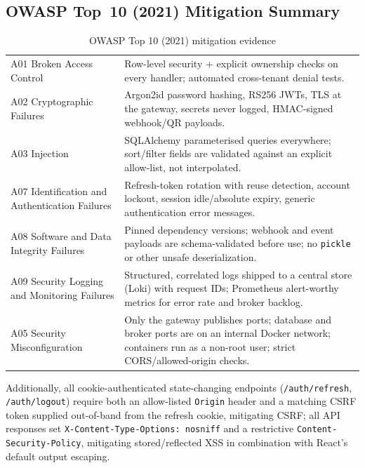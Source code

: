 \subsection{OWASP Top~10 (2021) Mitigation Summary}
\begin{table}[H]
  \centering\small
  \caption{OWASP Top 10 (2021) mitigation evidence}
  \label{tab:owasp}
  \begin{tabularx}{\linewidth}{L{4.3cm}X}
    \toprule
     &  \\
    \midrule
    A01 Broken Access Control & Row-level security + explicit ownership checks
      on every handler; automated cross-tenant denial tests. \\
    A02 Cryptographic Failures & Argon2id password hashing, RS256 JWTs, TLS at
      the gateway, secrets never logged, HMAC-signed webhook/QR payloads. \\
    A03 Injection & SQLAlchemy parameterised queries everywhere; sort/filter
      fields are validated against an explicit allow-list, not interpolated. \\
    A07 Identification and Authentication Failures & Refresh-token rotation
      with reuse detection, account lockout, session idle/absolute expiry,
      generic authentication error messages. \\
    A08 Software and Data Integrity Failures & Pinned dependency versions;
      webhook and event payloads are schema-validated before use; no
      \texttt{pickle} or other unsafe deserialization. \\
    A09 Security Logging and Monitoring Failures & Structured, correlated
      logs shipped to a central store (Loki) with request IDs; Prometheus
      alert-worthy metrics for error rate and broker backlog. \\
    A05 Security Misconfiguration & Only the gateway publishes ports; database
      and broker ports are on an internal Docker network; containers run as a
      non-root user; strict CORS/allowed-origin checks. \\
    \bottomrule
  \end{tabularx}
\end{table}

Additionally, all cookie-authenticated state-changing endpoints
(\texttt{/auth/refresh}, \texttt{/auth/logout}) require both an
allow-listed \texttt{Origin} header and a matching CSRF token supplied
out-of-band from the refresh cookie, mitigating CSRF; all API responses set
\texttt{X-Content-Type-Options: nosniff} and a restrictive
\texttt{Content-Security-Policy}, mitigating stored/reflected XSS in
combination with React's default output escaping.

